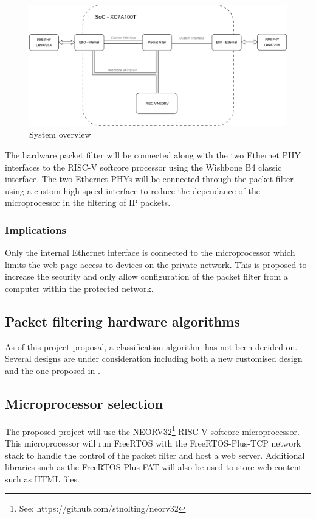 \begin{figure}[h]
    \centering
    \includegraphics[width=1\textwidth]{Images/ThesisSystemsOverview.png}
    \caption{System overview}
    \label{fig:sys-overview}
\end{figure}

\newpage

The hardware packet filter will be connected along with the two Ethernet PHY interfaces to the RISC-V softcore processor using the Wishbone B4 classic interface. 
The two Ethernet PHYs will be connected through the packet filter using a custom high speed interface to reduce the dependance of the microprocessor in the 
filtering of IP packets. 

\subsubsection{Implications}

Only the internal Ethernet interface is connected to the microprocessor which limits the web page access to devices on the private network. This is proposed to 
increase the security and only allow configuration of the packet filter from a computer within the protected network.

\subsection{Packet filtering hardware algorithms}
As of this project proposal, a classification algorithm has not been decided on. Several designs are under consideration including both a new customised design and the one proposed 
in \cite{FastRecongifFPGAFirewall}.


\subsection{Microprocessor selection}
The proposed project will use the NEORV32\footnote[1]{See: https://github.com/stnolting/neorv32} RISC-V softcore microprocessor. This microprocessor will  
run FreeRTOS with the FreeRTOS-Plus-TCP network stack to handle the control of the packet filter and host a web server. Additional libraries such as the 
FreeRTOS-Plus-FAT will also be used to store web content such as HTML files. 



